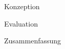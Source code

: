 \documentclass[12pt,a4paper,bibliography=totocnumbered,listof=totocnumbered]{scrartcl}
\numberwithin{figure}{section} %
\begin{document}
{Konzeption}

\pagebreak

{Evaluation}

\pagebreak

{Zusammenfassung}

\pagebreak
\nolinenumbers
\renewcommand\refname{Quellenverzeichnis}

\printbibliography
\pagebreak
\end{document}
